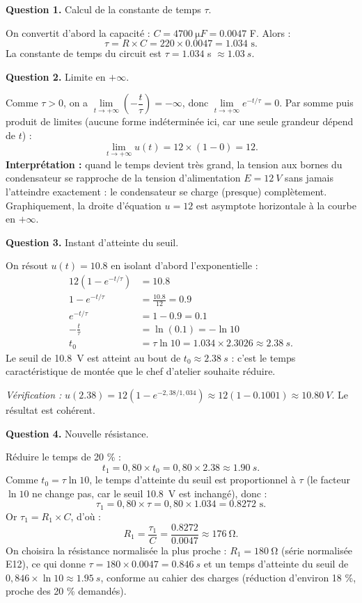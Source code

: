 \documentclass[11pt]{article}
\begin{document}
\begin{exoresolu}
\textbf{Question 1.} Calcul de la constante de temps $\tau$.

On convertit d'abord la capacité : $C = \SI{4700}{\micro F} = \num{0,0047}$ F. Alors :
\[ \tau = R \times C = 220 \times \num{0,0047} = \num{1,034} \text{ s}. \]
La constante de temps du circuit est $\tau = \num{1,034}$ s $\approx \SI{1,03}{s}$.

\medskip
\textbf{Question 2.} Limite en $+\infty$.

Comme $\tau > 0$, on a $\lim\limits_{t \to +\infty} \left(-\dfrac{t}{\tau}\right) = -\infty$, donc $\lim\limits_{t \to +\infty} e^{-t/\tau} = 0$. Par somme puis produit de limites (aucune forme indéterminée ici, car une seule grandeur dépend de $t$) :
\[ \lim_{t \to +\infty} u(t) = 12 \times (1 - 0) = 12. \]
\textbf{Interprétation :} quand le temps devient très grand, la tension aux bornes du condensateur se rapproche de la tension d'alimentation $E = \SI{12}{V}$ sans jamais l'atteindre exactement : le condensateur se charge (presque) complètement. Graphiquement, la droite d'équation $u = 12$ est asymptote horizontale à la courbe en $+\infty$.

\medskip
\textbf{Question 3.} Instant d'atteinte du seuil.

On résout $u(t) = \num{10,8}$ en isolant d'abord l'exponentielle :
\begin{align*}
12\left(1 - e^{-t/\tau}\right) &= \num{10,8} \\
1 - e^{-t/\tau} &= \frac{\num{10,8}}{12} = \num{0,9} \\
e^{-t/\tau} &= 1 - \num{0,9} = \num{0,1} \\
-\frac{t}{\tau} &= \ln(\num{0,1}) = -\ln 10 \\
t_0 &= \tau \ln 10 = \num{1,034} \times \num{2,3026} \approx \SI{2,38}{s}.
\end{align*}
Le seuil de \SI{10,8}{V} est atteint au bout de $t_0 \approx \SI{2,38}{s}$ : c'est le temps caractéristique de montée que le chef d'atelier souhaite réduire.

\emph{Vérification :} $u(\num{2,38}) = 12\left(1 - e^{-2,38/1,034}\right) \approx 12(1 - \num{0,1001}) \approx \SI{10,80}{V}$. Le résultat est cohérent.

\medskip
\textbf{Question 4.} Nouvelle résistance.

Réduire le temps de 20 \% :
\[ t_1 = 0,80 \times t_0 = 0,80 \times \num{2,38} \approx \SI{1,90}{s}. \]
Comme $t_0 = \tau \ln 10$, le temps d'atteinte du seuil est proportionnel à $\tau$ (le facteur $\ln 10$ ne change pas, car le seuil \SI{10,8}{V} est inchangé), donc :
\[ \tau_1 = 0,80 \times \tau = 0,80 \times \num{1,034} = \num{0,8272} \text{ s}. \]
Or $\tau_1 = R_1 \times C$, d'où :
\[ R_1 = \frac{\tau_1}{C} = \frac{\num{0,8272}}{\num{0,0047}} \approx \SI{176}{\ohm}. \]
On choisira la résistance normalisée la plus proche : $R_1 = \SI{180}{\ohm}$ (série normalisée E12), ce qui donne $\tau = 180 \times \num{0,0047} = \SI{0,846}{s}$ et un temps d'atteinte du seuil de $0,846 \times \ln 10 \approx \SI{1,95}{s}$, conforme au cahier des charges (réduction d'environ 18 \%, proche des 20 \% demandés).


\end{exoresolu}
\end{document}
